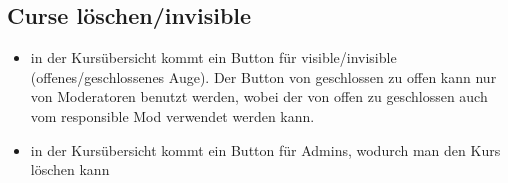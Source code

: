 \documentclass[colorback, accentcolor=tud1c, paper=a4]{tudexercise}
\begin{document}
\begin{multicols}{2}
\subsection*{Curse löschen/invisible}
\begin{itemize}
	\item in der Kursübersicht kommt ein Button für visible/invisible (offenes/geschlossenes Auge). Der Button von geschlossen zu offen kann nur von Moderatoren benutzt werden, wobei der von offen zu geschlossen auch vom responsible Mod verwendet werden kann.
\item in der Kursübersicht kommt ein Button für Admins, wodurch man den Kurs löschen kann
\end{itemize}



\end{multicols}
\end{document}

